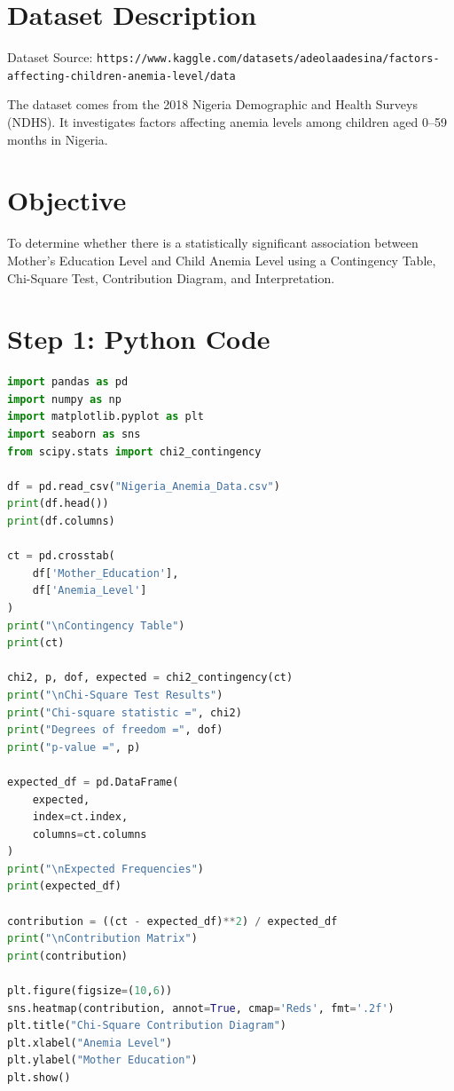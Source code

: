 \documentclass[12pt]{article}
\begin{document}
\section*{Dataset Description}

Dataset Source: \texttt{https://www.kaggle.com/datasets/adeolaadesina/factors-affecting-children-anemia-level/data}

The dataset comes from the 2018 Nigeria Demographic and Health Surveys (NDHS). It investigates factors affecting anemia levels among children aged 0--59 months in Nigeria.

\section*{Objective}

To determine whether there is a statistically significant association between Mother's Education Level and Child Anemia Level using a Contingency Table, Chi-Square Test, Contribution Diagram, and Interpretation.

\section*{Step 1: Python Code}

\begin{lstlisting}[language=Python]
import pandas as pd
import numpy as np
import matplotlib.pyplot as plt
import seaborn as sns
from scipy.stats import chi2_contingency

df = pd.read_csv("Nigeria_Anemia_Data.csv")
print(df.head())
print(df.columns)

ct = pd.crosstab(
    df['Mother_Education'],
    df['Anemia_Level']
)
print("\nContingency Table")
print(ct)

chi2, p, dof, expected = chi2_contingency(ct)
print("\nChi-Square Test Results")
print("Chi-square statistic =", chi2)
print("Degrees of freedom =", dof)
print("p-value =", p)

expected_df = pd.DataFrame(
    expected,
    index=ct.index,
    columns=ct.columns
)
print("\nExpected Frequencies")
print(expected_df)

contribution = ((ct - expected_df)**2) / expected_df
print("\nContribution Matrix")
print(contribution)

plt.figure(figsize=(10,6))
sns.heatmap(contribution, annot=True, cmap='Reds', fmt='.2f')
plt.title("Chi-Square Contribution Diagram")
plt.xlabel("Anemia Level")
plt.ylabel("Mother Education")
plt.show()
\end{lstlisting}
\end{document}
